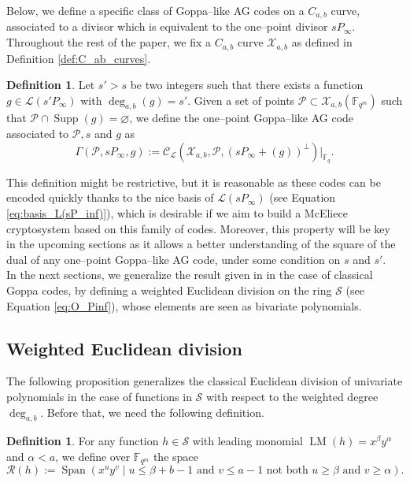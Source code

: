 \documentclass[a4paper]{amsart}
\theoremstyle{definition}
\newtheorem{definition}[thm]{Definition}
\theoremstyle{remark}
\newcommand{\calP}{\mathcal{P}}
\newcommand{\calL}{\mathcal{L}}
\newcommand{\calC}{\mathcal{C}}
\newcommand{\calR}{\mathcal{R}}
\newcommand{\calS}{\mathcal{S}}
\newcommand{\calX}{\mathcal{X}}
\newcommand{\fqm}{\mathbb{F}_{q^m}}
\newcommand{\fq}{\mathbb{F}_{q}}
\newcommand{\F}{\mathbb{F}}
\newcommand{\Span}[1]{\operatorname{Span}\left(#1\right)}
\newcommand{\LM}[1]{\operatorname{LM}\left(#1\right)}
\newcommand{\Supp}{\operatorname{Supp}}
\newcommand{\degab}[1]{\deg_{a,b}\left(#1\right)}
\begin{document}
Below, we define a specific class of Goppa--like AG codes on a $C_{a,b}$ curve, associated to a divisor which is equivalent to the one--point divisor $sP_\infty$. 
\noindent Throughout the rest of the paper, we fix a $C_{a,b}$ curve $\calX_{a,b}$ as defined in Definition \ref{def:C_ab_curves}.
\begin{definition} \label{def:one--point_Goppa--like_AG_codes_on_C_a,b_curves}
Let $s'>s$ be two integers such that there exists a function $g \in \calL(s'P_\infty)$ with $\degab{g}=s'$. Given a set of points  $\calP \subset \calX_{a,b}(\F_{q^m})$ such that $\calP \cap \Supp(g) = \varnothing$, we define the one--point Goppa--like AG code associated to $\calP,s$ and $g$ as 
\[\Gamma(\calP,sP_\infty,g) := \calC_{\calL}(\calX_{a,b},\calP,(sP_\infty+(g))^{\perp})|_{\fq}.\]
\end{definition}
This definition might be restrictive, but it is reasonable as these codes can be encoded quickly thanks to the nice basis of $\calL(sP_\infty)$ (see Equation \eqref{eq:basis_L(sP_inf)}), which is desirable if we aim to build a McEliece cryptosystem based on this family of codes. Moreover, this property will be key in the upcoming sections as it allows a better understanding of the square of the dual of any one--point Goppa--like AG code, under some condition on $s$ and $s'$. \\

\noindent In the next sections, we generalize the result given in \cite{MT21} in the case of classical Goppa codes, by defining a weighted Euclidean division on the ring $\calS$ (see Equation \eqref{eq:O_Pinf}), whose elements are seen as bivariate polynomials. 
\subsection{Weighted Euclidean division}
\noindent The following proposition generalizes the classical Euclidean division of univariate polynomials in the case of functions in $\calS$ with respect to the weighted degree $\deg_{a,b}$. Before that, we need the following definition.

\begin{definition} \label{def:remainder_space}
For any function $h \in \calS$ with leading monomial $\LM{h}=x^\beta y^\alpha$ and $\alpha < a$, we define over $\fqm$ the space
$$ \calR(h) := \Span{x^u y^v \mid u \leq \beta + b-1 \text{ and } v\leq a-1 \text{ not both }  u \geq \beta \text{ and } v \geq \alpha}.$$ 
\end{definition}
\end{document}
